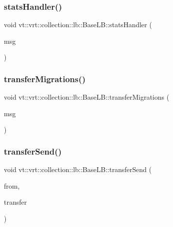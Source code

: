 \subsubsection{\texorpdfstring{stats\+Handler()}{statsHandler()}}
{\footnotesize\ttfamily void vt\+::vrt\+::collection\+::lb\+::\+Base\+L\+B\+::stats\+Handler (\begin{DoxyParamCaption}\item[{\hyperlink{structvt_1_1vrt_1_1collection_1_1lb_1_1_base_l_b_a0cddaecd9e8450190585d0607a3439f1}{Stats\+Msg\+Type} $\ast$}]{msg }\end{DoxyParamCaption})}

\mbox{\label{structvt_1_1vrt_1_1collection_1_1lb_1_1_base_l_b_adb9e1197bc690340bc1a4a6c77ac5254}} 
\subsubsection{\texorpdfstring{transfer\+Migrations()}{transferMigrations()}}
{\footnotesize\ttfamily void vt\+::vrt\+::collection\+::lb\+::\+Base\+L\+B\+::transfer\+Migrations (\begin{DoxyParamCaption}\item[{\hyperlink{structvt_1_1vrt_1_1collection_1_1lb_1_1_transfer_msg}{Transfer\+Msg}$<$ \hyperlink{structvt_1_1vrt_1_1collection_1_1lb_1_1_base_l_b_a329e8179ec41a1bd4924c79fe23a79af}{Transfer\+Vec\+Type} $>$ $\ast$}]{msg }\end{DoxyParamCaption})}

\mbox{\label{structvt_1_1vrt_1_1collection_1_1lb_1_1_base_l_b_af8d95bc056659de7121bca99ce2d9d73}} 
\subsubsection{\texorpdfstring{transfer\+Send()}{transferSend()}}
{\footnotesize\ttfamily void vt\+::vrt\+::collection\+::lb\+::\+Base\+L\+B\+::transfer\+Send (\begin{DoxyParamCaption}\item[{\hyperlink{namespacevt_a866da9d0efc19c0a1ce79e9e492f47e2}{Node\+Type}}]{from,  }\item[{\hyperlink{structvt_1_1vrt_1_1collection_1_1lb_1_1_base_l_b_a329e8179ec41a1bd4924c79fe23a79af}{Transfer\+Vec\+Type} const \&}]{transfer }\end{DoxyParamCaption})}



